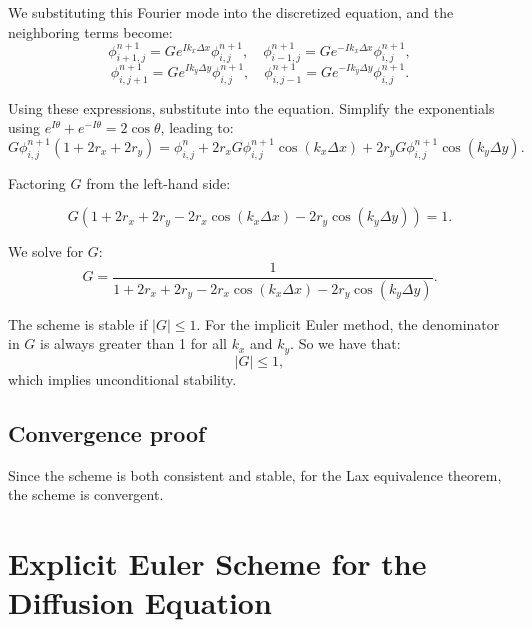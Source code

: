 \documentclass{article}
\begin{document}
We substituting this Fourier mode into the discretized equation, and the neighboring terms become:
\begin{equation*}
\phi_{i+1,j}^{n+1} = G e^{I k_x \Delta x} \phi_{i,j}^{n+1}, \quad \phi_{i-1,j}^{n+1} = G e^{-I k_x \Delta x} \phi_{i,j}^{n+1},
\end{equation*}
\begin{equation*}
\phi_{i,j+1}^{n+1} = G e^{I k_y \Delta y} \phi_{i,j}^{n+1}, \quad \phi_{i,j-1}^{n+1} = G e^{-I k_y \Delta y} \phi_{i,j}^{n+1}.
\end{equation*}

Using these expressions, substitute into the equation. Simplify the exponentials using $ e^{I \theta} + e^{-I \theta} = 2 \cos \theta $, leading to:
\begin{equation*}
G \phi_{i,j}^{n+1} \left( 1 + 2r_x + 2r_y \right) = \phi_{i,j}^n + 2r_x G \phi_{i,j}^{n+1} \cos(k_x \Delta x) + 2r_y G \phi_{i,j}^{n+1} \cos(k_y \Delta y).
\end{equation*}

Factoring $G$ from the left-hand side:

\begin{equation*}
G \left( 1 + 2r_x + 2r_y - 2r_x \cos(k_x \Delta x) - 2r_y \cos(k_y \Delta y) \right) = 1.
\end{equation*}

We solve for $ G $:
\begin{equation*}
G = \frac{1}{1 + 2r_x + 2r_y - 2r_x \cos(k_x \Delta x) - 2r_y \cos(k_y \Delta y)}.
\end{equation*}

The scheme is stable if $ |G| \leq 1 $. For the implicit Euler method, the denominator in $ G $ is always greater than 1 for all $ k_x $ and $ k_y $. So we have that:
\begin{equation}
|G| \leq 1,
\end{equation}
which implies unconditional stability.

\subsection{Convergence proof}
Since the scheme is both consistent and stable, for the Lax equivalence theorem, the scheme is convergent.

\section{Explicit Euler Scheme for the Diffusion Equation}
\end{document}
